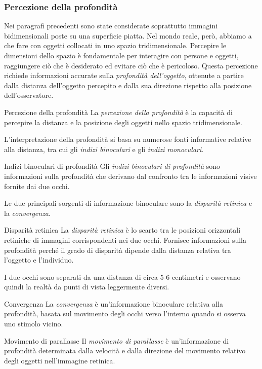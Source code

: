 \documentclass[a4paper]{article}
\begin{document}
\subsubsection{Percezione della profondità}
Nei paragrafi precedenti sono state considerate soprattutto immagini bidimensionali poste su una superficie piatta. Nel mondo reale, però, abbiamo a che fare con oggetti collocati in uno spazio tridimensionale.
Percepire le dimensioni dello spazio è fondamentale per interagire con persone e oggetti, raggiungere ciò che è desiderato ed evitare ciò che è pericoloso. Questa percezione richiede informazioni accurate sulla \emph{profondità dell'oggetto}, ottenute a partire dalla distanza dell'oggetto percepito e dalla sua direzione rispetto alla posizione dell'osservatore.
\begin{snippetdefinition}{Percezione della profondità}
    La \emph{percezione della profondità} è la capacità di percepire la distanza e la posizione degli oggetti nello spazio tridimensionale.
\end{snippetdefinition}
L'interpretazione della profondità si basa su numerose fonti informative relative alla distanza, tra cui gli \emph{indizi binoculari} e gli \emph{indizi monoculari}.
\begin{snippetdefinition}{Indizi binoculari di profondità}
    Gli \emph{indizi binoculari di profondità} sono informazioni sulla profondità che derivano dal confronto tra le informazioni visive fornite dai due occhi.
\end{snippetdefinition}
Le due principali sorgenti di informazione binoculare sono la \emph{disparità retinica} e la \emph{convergenza}.
\begin{snippetdefinition}{Disparità retinica}
    La \emph{disparità retinica} è lo scarto tra le posizioni orizzontali retiniche di immagini corrispondenti nei due occhi. Fornisce informazioni sulla profondità perché il grado di disparità dipende dalla distanza relativa tra l'oggetto e l'individuo.
\end{snippetdefinition}
I due occhi sono separati da una distanza di circa \(5\)-\(6\) centimetri e osservano quindi la realtà da punti di vista leggermente diversi.
\begin{snippetdefinition}{Convergenza}
    La \emph{convergenza} è un'informazione binoculare relativa alla profondità, basata sul movimento degli occhi verso l'interno quando si osserva uno stimolo vicino.
\end{snippetdefinition}
\begin{snippetdefinition}{Movimento di parallasse}
    Il \emph{movimento di parallasse} è un'informazione di profondità determinata dalla velocità e dalla direzione del movimento relativo degli oggetti nell'immagine retinica.
\end{snippetdefinition}
\end{document}

